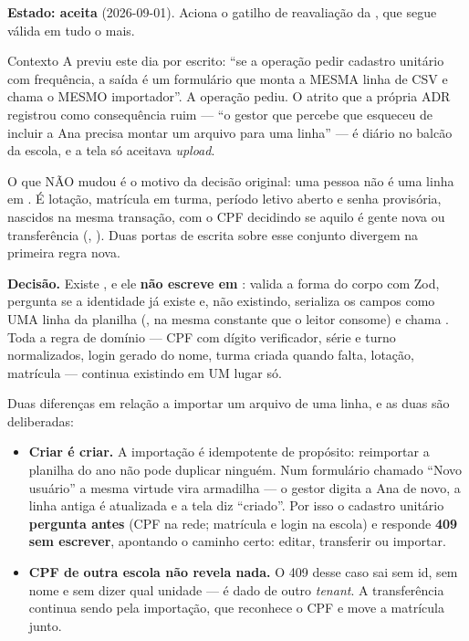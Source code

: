 \textbf{Estado: aceita} (2026-09-01). Aciona o gatilho de reavaliação da
, que segue válida em tudo o mais.

\begin{especificacao}{Contexto}
A  previu este dia por escrito: \enquote{se a operação pedir
cadastro unitário com frequência, a saída é um formulário que monta a MESMA
linha de CSV e chama o MESMO importador}. A operação pediu. O atrito que a
própria ADR registrou como consequência ruim --- \enquote{o gestor que percebe
que esqueceu de incluir a Ana precisa montar um arquivo para uma linha} --- é
diário no balcão da escola, e a tela só aceitava \emph{upload}.

O que NÃO mudou é o motivo da decisão original: uma pessoa não é uma linha em
. É lotação, matrícula em turma, período letivo aberto e senha
provisória, nascidos na mesma transação, com o CPF decidindo se aquilo é gente
nova ou transferência (, ). Duas portas de escrita
sobre esse conjunto divergem na primeira regra nova.
\end{especificacao}

\textbf{Decisão.} Existe , e ele \textbf{não escreve em
}: valida a forma do corpo com Zod, pergunta se a identidade já
existe e, não existindo, serializa os campos como UMA linha da planilha
(, na mesma constante  que o leitor
consome) e chama . Toda a regra de domínio --- CPF com
dígito verificador, série e turno normalizados, login gerado do nome, turma
criada quando falta, lotação, matrícula --- continua existindo em UM lugar só.

Duas diferenças em relação a importar um arquivo de uma linha, e as duas são
deliberadas:

\begin{itemize}
  \item \textbf{Criar é criar.} A importação é idempotente de propósito:
    reimportar a planilha do ano não pode duplicar ninguém. Num formulário
    chamado \enquote{Novo usuário} a mesma virtude vira armadilha --- o gestor
    digita a Ana de novo, a linha antiga é atualizada e a tela diz
    \enquote{criado}. Por isso o cadastro unitário \textbf{pergunta antes}
    (CPF na rede; matrícula e login na escola) e responde \textbf{409 sem
    escrever}, apontando o caminho certo: editar, transferir ou importar.
  \item \textbf{CPF de outra escola não revela nada.} O 409 desse caso sai sem
    id, sem nome e sem dizer qual unidade --- é dado de outro \emph{tenant}. A
    transferência continua sendo pela importação, que reconhece o CPF e move a
    matrícula junto.
\end{itemize}

